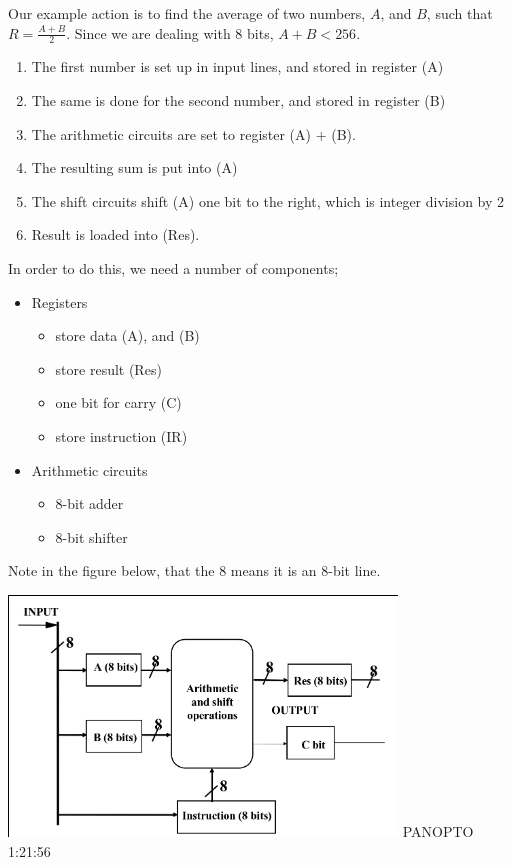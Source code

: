 \documentclass[a4paper, 12pt]{article}
\begin{document}
                Our example action is to find the average of two numbers, $A$, and $B$, such that $R = \frac{A + B}{2}$. Since we are dealing with 8 bits, $A + B < 256$.
                \begin{enumerate}[1.]
                    \itemsep0em
                    \item The first number is set up in input lines, and stored in register (A)
                    \item The same is done for the second number, and stored in register (B)
                    \item The arithmetic circuits are set to register (A) + (B).
                    \item The resulting sum is put into (A)
                    \item The shift circuits shift (A) one bit to the right, which is integer division by 2
                    \item Result is loaded into (Res).
                \end{enumerate}
                In order to do this, we need a number of components;
                \begin{itemize}
                    \item Registers
                        \begin{itemize}
                            \item store data (A), and (B)
                            \item store result (Res)
                            \item one bit for carry (C)
                            \item store instruction (IR)
                        \end{itemize}
                    \item Arithmetic circuits
                        \begin{itemize}
                            \item 8-bit adder
                            \item 8-bit shifter
                        \end{itemize}
                \end{itemize}
                Note in the figure below, that the 8 means it is an 8-bit line.

                \includegraphics[]{2019-04-08-15-00-51.png}
                PANOPTO 1:21:56
                \medskip
\end{document}
